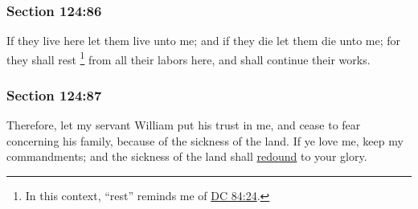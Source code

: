
	\subsubsection{Section 124:86} %
		\label{DC124-86}

		If they live here let them live unto me; and if they die let them die unto me; for they shall rest%
			\footnote{%
				In this context, ``rest'' reminds me of \hyperref[DC84-24]{DC 84:24}.
				}
		from all their labors here, and shall continue their works.


	\subsubsection{Section 124:87} %
		\label{DC124-87}

		Therefore, let my servant William put his trust in me, and cease to fear concerning his family, because of the sickness of the land.  If ye love me, keep my commandments; and the sickness of the land shall \hyperref[REDOUND]{redound} to your glory.


